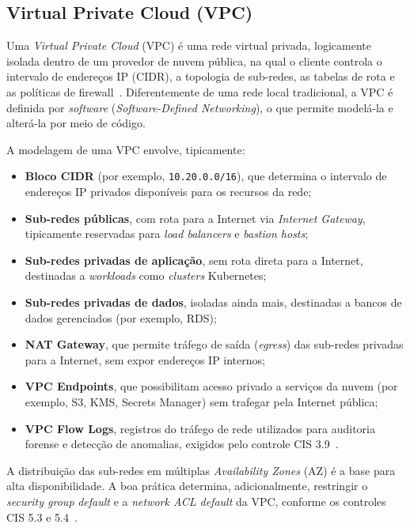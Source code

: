\subsection{Virtual Private Cloud (VPC)}

Uma \textit{Virtual Private Cloud} (VPC) é uma rede virtual privada, logicamente isolada dentro de um provedor de nuvem pública, na qual o cliente controla o intervalo de endereços IP (CIDR), a topologia de sub-redes, as tabelas de rota e as políticas de firewall~. Diferentemente de uma rede local tradicional, a VPC é definida por \textit{software} (\textit{Software-Defined Networking}), o que permite modelá-la e alterá-la por meio de código.

A modelagem de uma VPC envolve, tipicamente:

\begin{itemize}
    \item \textbf{Bloco CIDR} (por exemplo, \texttt{10.20.0.0/16}), que determina o intervalo de endereços IP privados disponíveis para os recursos da rede;
    \item \textbf{Sub-redes públicas}, com rota para a Internet via \textit{Internet Gateway}, tipicamente reservadas para \textit{load balancers} e \textit{bastion hosts};
    \item \textbf{Sub-redes privadas de aplicação}, sem rota direta para a Internet, destinadas a \textit{workloads} como \textit{clusters} Kubernetes;
    \item \textbf{Sub-redes privadas de dados}, isoladas ainda mais, destinadas a bancos de dados gerenciados (por exemplo, RDS);
    \item \textbf{NAT Gateway}, que permite tráfego de saída (\textit{egress}) das sub-redes privadas para a Internet, sem expor endereços IP internos;
    \item \textbf{VPC Endpoints}, que possibilitam acesso privado a serviços da nuvem (por exemplo, S3, KMS, Secrets Manager) sem trafegar pela Internet pública;
    \item \textbf{VPC Flow Logs}, registros do tráfego de rede utilizados para auditoria forense e detecção de anomalias, exigidos pelo controle CIS 3.9~.
\end{itemize}

A distribuição das sub-redes em múltiplas \textit{Availability Zones} (AZ) é a base para alta disponibilidade. A boa prática determina, adicionalmente, restringir o \textit{security group} \textit{default} e a \textit{network ACL default} da VPC, conforme os controles CIS 5.3 e 5.4~.

